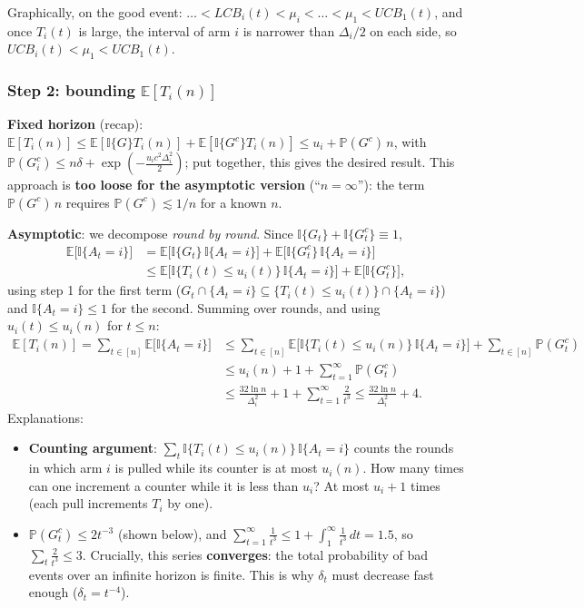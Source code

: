 Graphically, on the good event: $\dots < LCB_i(t) < \mu_i < \dots < \mu_1 < UCB_1(t)$, and once $T_i(t)$ is large, the interval of arm $i$ is narrower than $\Delta_i/2$ on each side, so $UCB_i(t) < \mu_1 < UCB_1(t)$.

\subsubsection*{Step 2: bounding $\mathbb{E}[T_i(n)]$}

\textbf{Fixed horizon} (recap): $\mathbb{E}[T_i(n)] \leq \mathbb{E}[\mathbb{I}\{G\}T_i(n)] + \mathbb{E}[\mathbb{I}\{G^c\}T_i(n)] \leq u_i + \mathbb{P}(G^c)\,n$, with $\mathbb{P}(G_i^c) \leq n\delta + \exp\left(-\frac{u_i c^2 \Delta_i^2}{2}\right)$; put together, this gives the desired result. This approach is \textbf{too loose for the asymptotic version} (``$n = \infty$''): the term $\mathbb{P}(G^c)\,n$ requires $\mathbb{P}(G^c) \lesssim 1/n$ for a known $n$.

\textbf{Asymptotic}: we decompose \emph{round by round}. Since $\mathbb{I}\{G_t\} + \mathbb{I}\{G_t^c\} \equiv 1$,
\begin{align*}
\mathbb{E}\big[\mathbb{I}\{A_t = i\}\big] &= \mathbb{E}\big[\mathbb{I}\{G_t\}\,\mathbb{I}\{A_t = i\}\big] + \mathbb{E}\big[\mathbb{I}\{G_t^c\}\,\mathbb{I}\{A_t = i\}\big] \\
&\leq \mathbb{E}\big[\mathbb{I}\{T_i(t) \leq u_i(t)\}\,\mathbb{I}\{A_t = i\}\big] + \mathbb{E}\big[\mathbb{I}\{G_t^c\}\big],
\end{align*}
using step 1 for the first term ($G_t \cap \{A_t = i\} \subseteq \{T_i(t) \leq u_i(t)\} \cap \{A_t = i\}$) and $\mathbb{I}\{A_t = i\} \leq 1$ for the second. Summing over rounds, and using $u_i(t) \leq u_i(n)$ for $t \leq n$:
\begin{align*}
\mathbb{E}[T_i(n)] = \sum_{t\in[n]} \mathbb{E}\big[\mathbb{I}\{A_t = i\}\big]
&\leq \sum_{t\in[n]} \mathbb{E}\big[\mathbb{I}\{T_i(t) \leq u_i(n)\}\,\mathbb{I}\{A_t = i\}\big] + \sum_{t\in[n]}\mathbb{P}(G_t^c) \\
&\leq u_i(n) + 1 + \sum_{t=1}^\infty \mathbb{P}(G_t^c) \\
&\leq \frac{32\ln n}{\Delta_i^2} + 1 + \sum_{t=1}^\infty \frac{2}{t^3} \leq \frac{32\ln n}{\Delta_i^2} + 4.
\end{align*}
Explanations:
\begin{itemize}
    \item \textbf{Counting argument}: $\sum_t \mathbb{I}\{T_i(t) \leq u_i(n)\}\,\mathbb{I}\{A_t = i\}$ counts the rounds in which arm $i$ is pulled while its counter is at most $u_i(n)$. How many times can one increment a counter while it is less than $u_i$? At most $u_i + 1$ times (each pull increments $T_i$ by one).
    \item $\mathbb{P}(G_t^c) \leq 2t^{-3}$ (shown below), and $\sum_{t=1}^\infty \frac{1}{t^3} \leq 1 + \int_1^\infty \frac{1}{t^3}\,dt = 1.5$, so $\sum_t \frac{2}{t^3} \leq 3$. Crucially, this series \textbf{converges}: the total probability of bad events over an infinite horizon is finite. This is why $\delta_t$ must decrease fast enough ($\delta_t = t^{-4}$).
\end{itemize}

